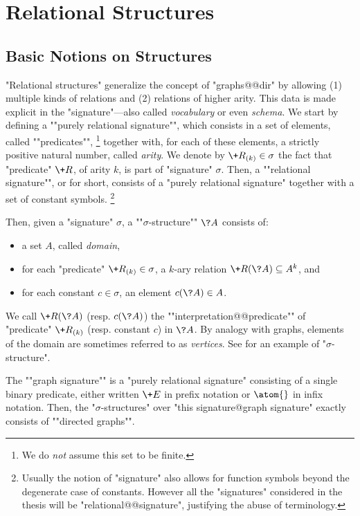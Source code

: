 \section{Relational Structures}

\subsection{Basic Notions on Structures}

"Relational structures" generalize the concept of "graphs@@dir"
by allowing (1) multiple kinds of relations and
(2) relations of higher arity. This data is made explicit in
the "signature"---also called \emph{vocabulary} or even \emph{schema}.
We start by defining a \AP""purely relational signature"", which consists
in a set of elements, called ""predicates"",%
\footnote{We do \emph{not} assume this set to be finite.}
together with, for each
of these elements, a strictly positive natural number, called \emph{arity}.
We denote by $\+R_{(k)} \in \sigma$ the fact that "predicate" $\+R$, of arity
$k$, is part of "signature" $\sigma$.
Then, a \AP""relational signature"", or  for short, consists of a "purely relational 
signature" together with a set of constant symbols.%
\footnote{Usually the notion of "signature" also allows for function symbols beyond
the degenerate case of constants. However all the "signatures" considered in the thesis
will be "relational@@signature", justifying the abuse of terminology.}

Then, given a "signature" $\sigma$, a ""$\sigma$-structure"" $\?A$
consists of:
\begin{itemize}
	\item a set $A$, called \emph{domain},
	\item for each "predicate" $\+R_{(k)} \in \sigma$, a $k$-ary relation
		$\+R(\?A) \subseteq A^k$, and
	\item for each constant $c \in \sigma$, an element $c(\?A) \in A$.
\end{itemize}
We call $\+R(\?A)$ (resp. $c(\?A)$) the \AP""interpretation@@predicate""
of "predicate" $\+R_{(k)}$ (resp. constant $c$) in $\?A$.
By analogy with graphs, elements of the domain are sometimes referred to as
\emph{vertices}. See  for an example
of "$\sigma$-structure".

The \AP""graph signature"" is a "purely relational signature"
consisting of a single binary predicate, either written $\+E$ in prefix notation
or $\atom{}$ in infix notation.
Then, the "$\sigma$-structures" over "this signature@graph signature"
exactly consists of \AP""directed graphs"".


